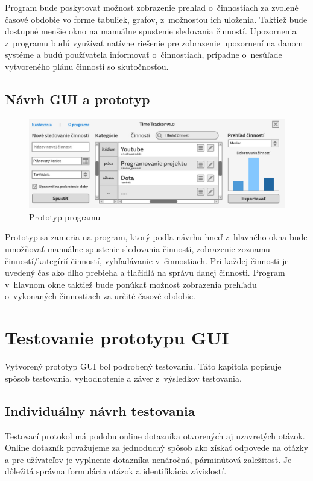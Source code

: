 \documentclass[]{article}
\begin{document}
Program bude poskytovať možnosť zobrazenie prehľad o~činnostiach za zvolené časové obdobie vo forme tabuliek, grafov, z~možnosťou ich uloženia. Taktiež bude dostupné menšie okno na manuálne spustenie sledovania činností. Upozornenia z~programu budú využívať natívne riešenie pre zobrazenie upozornení na danom systéme a budú používateľa informovať o~činnostiach, prípadne o~nesúľade vytvoreného plánu činností so skutočnosťou.

\subsection{Návrh GUI a prototyp}

\begin{figure}[h!]
	\includegraphics[width=\textwidth]{prototyp}
	\caption{Prototyp programu}
\end{figure}

Prototyp sa zameria na program, ktorý podľa návrhu hneď z~hlavného okna bude umožňovať manuálne spustenie sledovania činnosti, zobrazenie zoznamu činností/kategírií činností, vyhľadávanie v~činnostiach. Pri každej činnosti je uvedený čas ako dlho prebieha a tlačidlá na správu danej činnosti. Program v~hlavnom okne taktiež bude ponúkať možnosť zobrazenia prehľadu o~vykonaných činnostiach za určité časové obdobie.

\section{Testovanie prototypu GUI}

Vytvorený prototyp GUI bol podrobený testovaniu. Táto kapitola popisuje spôsob testovania, vyhodnotenie a záver z~výsledkov testovania.

\subsection{Individuálny návrh testovania}
Testovací protokol má podobu online dotazníka\cite{vyhodnotenie} otvorených aj uzavretých otázok. Online dotazník považujeme za jednoduchý spôsob ako získať odpovede na otázky a pre užívateľov je vyplnenie dotazníka nenáročná, párminútová zaležitosť. Je dôležitá správna formulácia otázok a identifikácia závislostí\cite{experimenty}.
\end{document}
